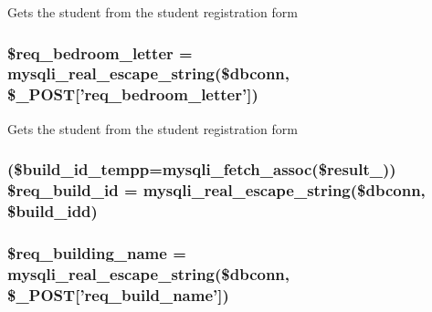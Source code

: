 \-Gets the student from the student registration form \hypertarget{admin__view_2validate_2studentVal_8php_adab4b11b8fdbb9622f5c281bcdcc8c5d}{
\subsubsection[{\$req\-\_\-bedroom\-\_\-letter}]{\setlength{\rightskip}{0pt plus 5cm}\$req\-\_\-bedroom\-\_\-letter = mysqli\-\_\-real\-\_\-escape\-\_\-string(\$dbconn, \$\-\_\-\-P\-O\-S\-T\mbox{[}'req\-\_\-bedroom\-\_\-letter'\mbox{]})}}\label{admin__view_2validate_2studentVal_8php_adab4b11b8fdbb9622f5c281bcdcc8c5d}
\-Gets the student from the student registration form \hypertarget{admin__view_2validate_2studentVal_8php_aa7111d653b27e29a80df8d7421848981}{
\subsubsection[{\$req\-\_\-build\-\_\-id}]{ (\$build\-\_\-id\-\_\-tempp=mysqli\-\_\-fetch\-\_\-assoc(\$result\-\_)) \$req\-\_\-build\-\_\-id = mysqli\-\_\-real\-\_\-escape\-\_\-string(\$dbconn, \$build\-\_\-idd)}}\label{admin__view_2validate_2studentVal_8php_aa7111d653b27e29a80df8d7421848981}
\hypertarget{admin__view_2validate_2studentVal_8php_a36592f31d5a2db44ff8fdf35ef05776d}{
\subsubsection[{\$req\-\_\-building\-\_\-name}]{\setlength{\rightskip}{0pt plus 5cm}\$req\-\_\-building\-\_\-name = mysqli\-\_\-real\-\_\-escape\-\_\-string(\$dbconn, \$\-\_\-\-P\-O\-S\-T\mbox{[}'req\-\_\-build\-\_\-name'\mbox{]})}}\label{admin__view_2validate_2studentVal_8php_a36592f31d5a2db44ff8fdf35ef05776d}
